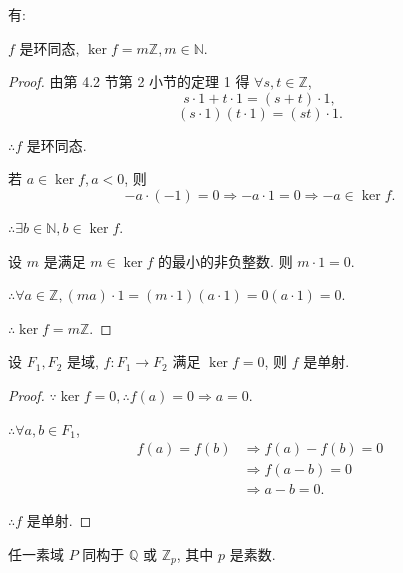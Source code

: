 \documentclass{ctexart}
\begin{document}
有:
\begin{lemma}\label{l3.1}
    $f$ 是环同态, $\ker f=m\mathbb{Z},m\in\mathbb{N}$.
\end{lemma}
\begin{proof}
    由第 4.2 节第 2 小节的定理 1 得
    $\forall s,t\in\mathbb{Z}$,
    \[s\cdot1+t\cdot1=(s+t)\cdot1,\]
    \[(s\cdot1)(t\cdot1)=(st)\cdot1.\]

    $\therefore f$ 是环同态.

    若 $a\in\ker f,a<0$, 则
    \[-a\cdot(-1)=0\Rightarrow-a\cdot1=0\Rightarrow-a\in\ker f.\]

    $\therefore\exists b\in\mathbb{N},b\in\ker f$.

    设 $m$ 是满足 $m\in\ker f$ 的最小的非负整数. 则 $m\cdot1=0$.

    $\therefore\forall a\in\mathbb{Z},(ma)\cdot1=(m\cdot1)(a\cdot1)=0(a\cdot1)=0$.

    $\therefore\ker f=m\mathbb{Z}$.
\end{proof}
\begin{lemma}\label{l3.2}
    设 $F_1,F_2$ 是域, $f:F_1\to F_2$ 满足 $\ker f=0$, 则 $f$ 是单射.
\end{lemma}
\begin{proof}
    $\because\ker f=0,\therefore f(a)=0\Rightarrow a=0$.

    $\therefore\forall a,b\in F_1$,
    \begin{align*}
        f(a)=f(b) & \Rightarrow f(a)-f(b)=0 \\
        & \Rightarrow f(a-b)=0 \\
        & \Rightarrow a-b=0.
    \end{align*}

    $\therefore f$ 是单射.
\end{proof}
\begin{theorem}
    任一素域 $P$ 同构于 $\mathbb{Q}$ 或 $\mathbb{Z}_p$, 其中 $p$ 是素数.
\end{theorem}
\end{document}
